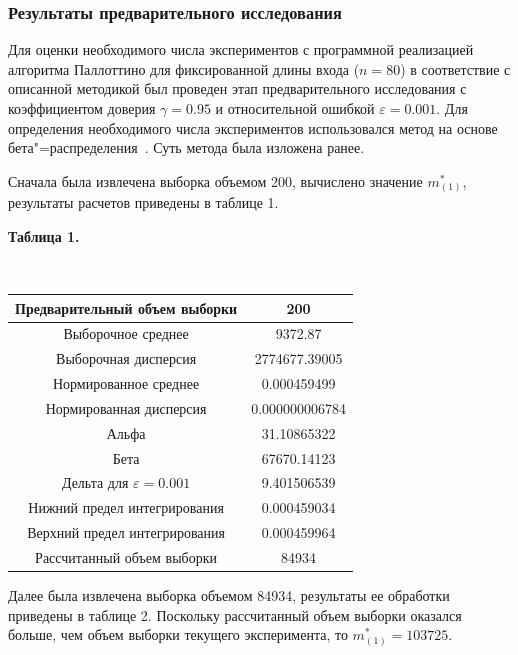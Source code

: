 \documentclass[a4paper, article, 14pt]{extarticle}
\begin{document}
\subsubsection{Результаты предварительного исследования}\label{subsec:results_part_1}

Для оценки необходимого числа экспериментов с программной реализацией алгоритма Паллоттино для фиксированной длины входа ($n = 80$) в соответствие с описанной методикой был проведен этап предварительного исследования с коэффициентом доверия $\gamma = 0.95$ и относительной ошибкой $\varepsilon = 0.001$. Для определения необходимого числа экспериментов использовался метод на основе бета"=распределения~\cite{petrushyn_ulyanov_planning}. Суть метода была изложена ранее.

Сначала была извлечена выборка объемом 200, вычислено значение $m_{(1)}^*$, результаты расчетов приведены в таблице 1.

\newpage

\begin{center}\label{table1}
	\begin{small}
		\textbf{Таблица 1.}
	\end{small}\\
	\hfill \break
	\begin{tabular}{|c|c|}
		\hline
		Предварительный объем выборки & 200\\
		\hline
		Выборочное среднее & 9372.87\\
		\hline
		Выборочная дисперсия & 2774677.39005\\
		\hline
		Нормированное среднее & 0.000459499\\
		\hline
		Нормированная дисперсия & 0.000000006784\\
		\hline
		Альфа & 31.10865322\\
		\hline
		Бета & 67670.14123\\
		\hline
		Дельта для $\varepsilon = 0.001$ & 9.401506539\\
		\hline
		Нижний предел интегрирования & 0.000459034\\
		\hline
		Верхний предел интегрирования & 0.000459964\\
		\hline
		Рассчитанный объем выборки & 84934\\
		\hline
	\end{tabular}
\end{center}

Далее была извлечена выборка объемом 84934, результаты ее обработки приведены в таблице 2. Поскольку рассчитанный объем выборки оказался больше, чем объем выборки текущего эксперимента, то $m_{(1)}^* = 103725$.
\end{document}
